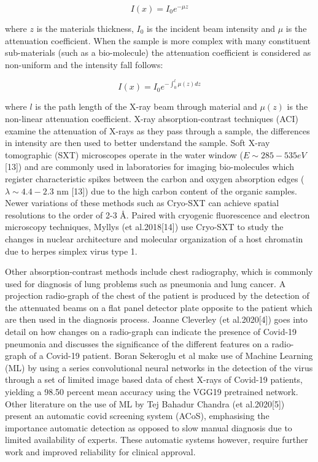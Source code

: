 \documentclass[11pt]{report}
\begin{document}
$$I(x) = I_0 e^{-\mu z}$$

where $z$ is the materials thickness, $I_0$ is the incident beam intensity and $\mu$ is the attenuation coefficient. When the sample is more complex with many constituent sub-materials (such as a bio-molecule) the attenuation coefficient is considered as non-uniform and the intensity fall follows: 

$$I(x) = I_0 e^{-\int_{0}^{l}\mu (z) dz}$$


where $l$ is the path length of the X-ray beam through material and $\mu(z)$ is the non-linear attenuation coefficient. X-ray absorption-contrast techniques (ACI) examine the attenuation of X-rays as they pass through a sample, the differences in intensity are then used to better understand the sample. Soft X-ray tomographic (SXT) microscopes operate in the water window ($E \sim 285-535 eV$ [13]) and are commonly used in laboratories for imaging bio-molecules which register characteristic spikes between the carbon and oxygen absorption edges  ($\lambda \sim 4.4-2.3$ nm [13]) due to the high carbon content of the organic samples. Newer variations of these methods such as Cryo-SXT can achieve spatial resolutions to the order of 2-3 Å. Paired with cryogenic fluorescence and electron microscopy techniques, Myllys (et al.2018[14]) use Cryo-SXT to study the changes in nuclear architecture and molecular organization of a host chromatin due to herpes simplex virus type 1.

Other absorption-contrast methods include chest radiography, which is commonly used for diagnosis of lung problems such as pneumonia and lung cancer. A projection radio-graph of the chest of the patient is produced by the detection of the attenuated beams on a flat panel detector plate opposite to the patient which are then used in the diagnosis process.  
Joanne Cleverley (et al.2020[4]) goes into detail on how changes on a radio-graph can indicate the presence of Covid-19 pneumonia and discusses the significance of the different features on a radio-graph of a Covid-19 patient. Boran Sekeroglu et al \cite{neuralnetwork} make use of Machine Learning (ML) by using a series convolutional neural networks in the detection of the virus through a set of limited image based data of chest X-rays of Covid-19 patients, yielding a 98.50 percent mean accuracy using the VGG19 pretrained network. Other literature on the use of ML by Tej Bahadur Chandra (et al.2020[5]) present an automatic covid screening system (ACoS), emphasising the importance automatic detection as opposed to slow manual diagnosis due to limited availability of experts. These automatic systems however, require further work and improved reliability for clinical approval.
\end{document}

